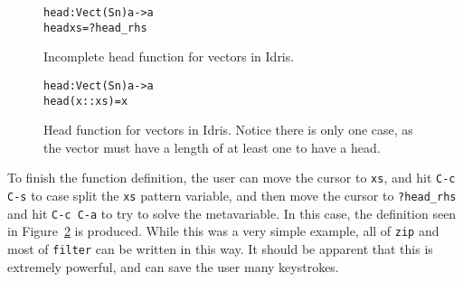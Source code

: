 \begin{figure}
\begin{alltt}
head : Vect (S n) a -> a
head xs = ?head_rhs
\end{alltt}
\caption{Incomplete head function for vectors in Idris.}
\label{fig:incomplete_head}
\end{figure}

\begin{figure}
\begin{alltt}
head : Vect (S n) a -> a
head (x :: xs) = x
\end{alltt}
\caption{Head function for vectors in Idris. Notice there is only one case, as the vector must have a length of at least one to have a head.}
\label{fig:head}
\end{figure}

To finish the function definition, the user can move the cursor to \texttt{xs}, and hit \texttt{C-c C-s} to case split the \texttt{xs} pattern variable, and then move the cursor to \texttt{?head\_rhs} and hit \texttt{C-c C-a} to try to solve the metavariable.
In this case, the definition seen in Figure~\ref{fig:head} is produced.
While this was a very simple example, all of \texttt{zip} and most of \texttt{filter} can be written in this way.
It should be apparent that this is extremely powerful, and can save the user many keystrokes.

